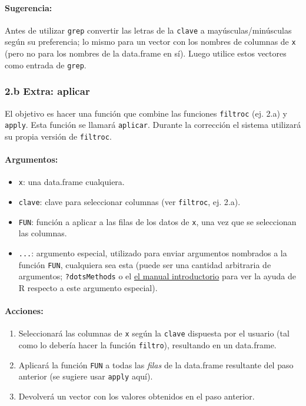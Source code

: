 \documentclass[]{article}
\begin{document}
\paragraph{Sugerencia:}

Antes de utilizar \texttt{grep} convertir las letras de la
\texttt{clave} a mayúsculas/minúsculas según su preferencia; lo mismo
para un vector con los nombres de columnas de \texttt{x} (pero no para
los nombres de la data.frame en sí). Luego utilice estos vectores como
entrada de \texttt{grep}.

\subsubsection{2.b Extra: aplicar}

El objetivo es hacer una función que combine las funciones
\texttt{filtroc} (ej. 2.a) y \texttt{apply}. Esta función se llamará
\texttt{aplicar}. Durante la corrección el sistema utilizará su propia
versión de \texttt{filtroc}.

\paragraph{Argumentos:}

\begin{itemize}
\item
  \texttt{x}: una data.frame cualquiera.
\item
  \texttt{clave}: clave para seleccionar columnas (ver \texttt{filtroc},
  ej. 2.a).
\item
  \texttt{FUN}: función a aplicar a las filas de los datos de
  \texttt{x}, una vez que se seleccionan las columnas.
\item
  \texttt{...}: argumento especial, utilizado para enviar argumentos
  nombrados a la función \texttt{FUN}, cualquiera sea esta (puede ser
  una cantidad arbitraria de argumentos; \texttt{?dotsMethods} o el
  \href{http://cran.r-project.org/doc/manuals/r-release/R-intro.html\#The-three-dots-argument}{el
  manual introductorio} para ver la ayuda de R respecto a este argumento
  especial).
\end{itemize}

\paragraph{Acciones:}

\begin{enumerate}[1.]
\item
  Seleccionará las columnas de \texttt{x} según la \texttt{clave}
  dispuesta por el usuario (tal como lo debería hacer la función
  \texttt{filtro}), resultando en un data.frame.
\item
  Aplicará la función \texttt{FUN} a todas las \emph{filas} de la
  data.frame resultante del paso anterior (se sugiere usar
  \texttt{apply} aquí).
\item
  Devolverá un vector con los valores obtenidos en el paso anterior.
\end{enumerate}
\end{document}
